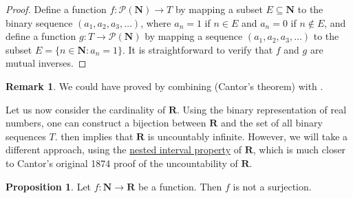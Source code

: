 \documentclass[12pt]{article}
\theoremstyle{definition}
\newtheorem{proposition}[definition]{Proposition}
\newtheorem*{remark}{Remark}
\newcommand{\N}{\mathbf{N}}
\newcommand{\R}{\mathbf{R}}
\begin{document}
\begin{proof}
    Define a function \( f : \mathscr{P}(\N) \to T \) by mapping a subset \( E \subseteq \N \) to the binary sequence \( (a_1, a_2, a_3, \ldots) \), where \( a_n = 1 \) if \( n \in E \) and \( a_n = 0 \) if \( n \not\in E \), and define a function \( g : T \to \mathscr{P}(\N) \) by mapping a sequence \( (a_1, a_2, a_3, \ldots) \) to the subset \( E = \{ n \in \N : a_n = 1 \} \). It is straightforward to verify that \( f \) and \( g \) are mutual inverses.
\end{proof}

\begin{remark}
    We could have proved  by combining  (Cantor's theorem) with .
\end{remark}

Let us now consider the cardinality of \( \R \). Using the binary representation of real numbers, one can construct a bijection between \( \R \) and the set of all binary sequences \( T \).  then implies that \( \R \) is uncountably infinite. However, we will take a different approach, using the \href{https://lew98.github.io/Mathematics/Miscellaneous/Nested_interval_property.pdf}{nested interval property} of \( \R \), which is much closer to Cantor's original 1874 proof of the uncountability of \( \R \).

\begin{proposition}
\label{prop:no_surjection_from_N_to_R}
    Let \( f : \N \to \R \) be a function. Then \( f \) is not a surjection.
\end{proposition}
\end{document}
